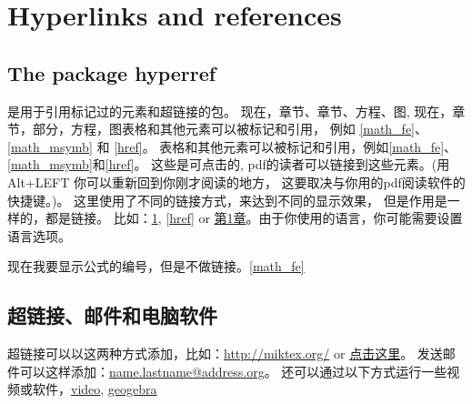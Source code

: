 
\chapter{Hyperlinks and references}
\label{href}


\section{The package hyperref}


 是用于引用标记过的元素和超链接的包。
现在，章节、章节、方程、图, 现在，章节，部分，方程，图表格和其他元素可以被标记和引用，
例如 \autoref{math_fe}、\autoref{math_msymb} 和 \autoref{href}。
表格和其他元素可以被标记和引用，例如\autoref{math_fe}、\autoref{math_msymb}和\autoref{href}。
这些是可点击的, pdf的读者可以链接到这些元素。(用Alt+LEFT 你可以重新回到你刚才阅读的地方， 这要取决与你用的pdf阅读软件的快捷键。)。
这里使用了不同的链接方式，来达到不同的显示效果， 但是作用是一样的，都是链接。
比如：\ref{href}, \autoref{href} or \hyperref[href]{第\ref*{href}章}。由于你使用的语言，你可能需要设置语言选项。

现在我要显示公式的编号，但是不做链接。\autoref*{math_fe}


\section{超链接、邮件和电脑软件}

超链接可以以这两种方式添加，比如：\url{http://miktex.org/} or \href{http://miktex.org/}{点击这里}。
发送邮件可以这样添加：\href{mailto:name.lastname@address.org}{name.lastname@address.org}。
还可以通过以下方式运行一些视频或软件，\href{run:attachments/video.mp4}{video}, 
\href{run:attachments/3Dpractice.ggb}{geogebra}

